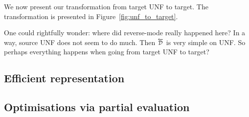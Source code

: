 We now present our transformation from target UNF to target. 
The transformation is presented in Figure~\ref{fig:unf_to_target}.



\begin{remark}
    One could rightfully wonder: where did reverse-mode really happened here?
    In a way, source UNF does not seem to do much. 
    Then $\Dsynrevsymbol$ is very simple on UNF.
    So perhaps everything happens when going from target UNF to target?
\end{remark}



\subsection{Efficient representation}

\subsection{Optimisations via partial evaluation}